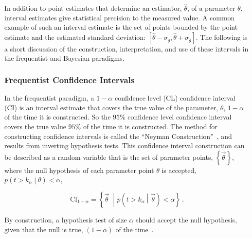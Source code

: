 In addition to point estimates that determine an estimator, $\hat{\theta}$, of a parameter $\theta$, interval estimates give statistical precision to the measured value.
A common example of such an interval estimate is the set of points bounded by the point estimate and the estimated standard deviation: $\left[\hat{\theta} - \sigma_{\hat{\theta}}, \hat{\theta} + \sigma_{\hat{\theta}}\right]$.
The following is a short discussion of the construction, interpretation, and use of these intervals in the frequentist and Bayesian paradigms.

\subsubsection{Frequentist Confidence Intervals}

In the frequentist paradigm, a $1-\alpha$ confidence level (CL) confidence interval (CI) is an interval estimate that covers the true value of the parameter, $\theta$, $1-\alpha$ of the time it is constructed.
So the $95\%$ confidence level confidence interval covers the true value $95\%$ of the time it is constructed.
The method for constructing confidence intervals is called the ``Neyman Construction''~\cite{Neyman:1937uhy}, and results from inverting hypothesis tests.
This confidence interval construction can be described as a random variable that is the set of parameter points, $\left\{\vec{\theta}\right\}$, where the null hypothesis of each parameter point $\theta$ is accepted, $p\left(t > k_{\alpha}\middle| \theta\right) < \alpha$,

\begin{equation}
 \mathrm{CI}_{1-\alpha} = \left\{\vec{\theta}\,\middle| \,p\left(t > k_{\alpha}\middle| \vec{\theta}\right) < \alpha\right\}\,.
 \label{eq:confidence_interval}
\end{equation}

By construction, a hypothesis test of size $\alpha$ should accept the null hypothesis, given that the null is true, $(1-\alpha)$ of the time~\cite{Cranmer:2015nia}.

